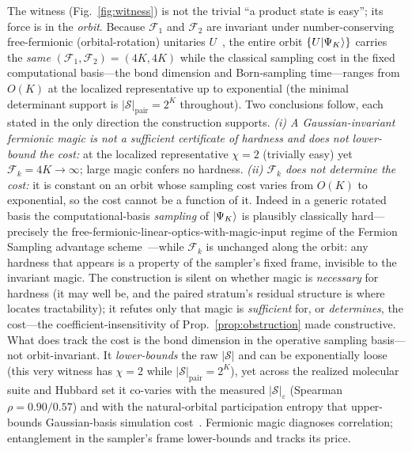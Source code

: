 \noindent The witness (Fig.~\ref{fig:witness}) is not the trivial ``a product state is easy''; its force is in the \emph{orbit}.
Because $\mathcal F_1$ and $\mathcal F_2$ are invariant under number-conserving free-fermionic
(orbital-rotation) unitaries $U$~\cite{sierant2026}, the entire orbit $\{U\lvert \Psi_K \rangle\}$ carries the
\emph{same} $(\mathcal F_1,\mathcal F_2)=(4K,4K)$ while the classical sampling cost in the fixed
computational basis---the bond dimension and Born-sampling time---ranges from $O(K)$ at the localized
representative up to exponential (the minimal determinant support is $|\mathcal S|_{\mathrm{pair}}=2^{K}$
throughout). Two conclusions follow, each stated
in the only direction the construction supports. \emph{(i) A Gaussian-invariant fermionic magic is not a
sufficient certificate of hardness and does not lower-bound the cost:} at the localized representative
$\chi=2$ (trivially easy) yet $\mathcal F_k=4K\to\infty$; large magic confers no hardness. \emph{(ii)
$\mathcal F_k$ does not determine the cost:} it is constant on an orbit whose sampling cost varies from
$O(K)$ to exponential, so the cost cannot be a function of it. Indeed in a generic rotated basis the
computational-basis \emph{sampling} of $\lvert \Psi_K \rangle$ is plausibly classically hard---precisely the
free-fermionic-linear-optics-with-magic-input regime of the Fermion Sampling advantage
scheme~\cite{fermionsampling2022}---while $\mathcal F_k$ is unchanged along the orbit: any hardness that
appears is a property of the sampler's fixed frame, invisible to the invariant magic. The construction is
silent on whether magic is \emph{necessary} for hardness (it may well be, and the paired stratum's
residual structure is where~\cite{oh2026} locates tractability); it refutes only that magic is
\emph{sufficient} for, or \emph{determines}, the cost---the coefficient-insensitivity of
Prop.~\ref{prop:obstruction} made constructive. What does track the cost is the bond dimension in the
operative sampling basis---not orbit-invariant. It \emph{lower-bounds} the raw $|\mathcal S|$ and can be
exponentially loose (this very witness has $\chi=2$ while $|\mathcal S|_{\mathrm{pair}}=2^{K}$), yet
across the realized molecular suite and Hubbard set it co-varies with the measured
$|\mathcal S|_\varepsilon$ (Spearman $\rho=0.90/0.57$) and with the natural-orbital participation entropy that upper-bounds Gaussian-basis
simulation cost~\cite{tarabunga2026}. Fermionic magic diagnoses correlation; entanglement in the sampler's frame
lower-bounds and tracks its price.

